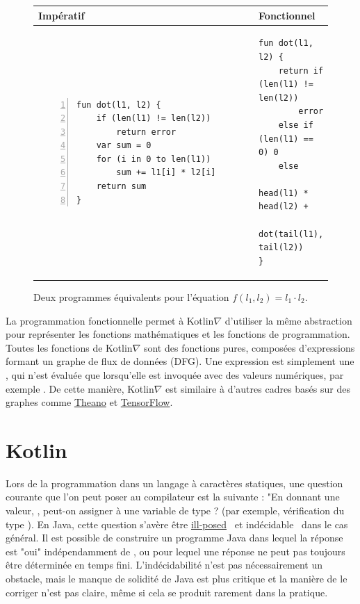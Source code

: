 \begin{figure}[t]
    \centering
    \begin{tabular}{|l|l|}
        \hline
        Impératif & Fonctionnel \\
        \hline
{\begin{lstlisting}[style=barelisting, linewidth=5.7cm, numbers=left]
fun dot(l1, l2) {
    if (len(l1) != len(l2))
        return error
    var sum = 0
    for (i in 0 to len(l1))
        sum += l1[i] * l2[i]
    return sum
}
\end{lstlisting}}
        &
{\begin{lstlisting}[style=barelisting, linewidth=6.5cm, numbers=none]
fun dot(l1, l2) {
    return if (len(l1) != len(l2))
        error
    else if (len(l1) == 0) 0
    else
        head(l1) * head(l2) +
        dot(tail(l1), tail(l2))
}
\end{lstlisting}}
        \\
        \hline
    \end{tabular}
    \caption{Deux programmes équivalents pour l'équation $f(l_1, l_2) = l_1 \cdot l_2$.}
    \label{fig:fp_vs_ip}
\end{figure}

La programmation fonctionnelle permet à Kotlin$\nabla$ d'utiliser la même abstraction pour représenter les fonctions mathématiques et les fonctions de programmation. Toutes les fonctions de Kotlin$\nabla$ sont des fonctions pures, composées d'expressions formant un graphe de flux de données (DFG). Une expression est simplement une , qui n'est évaluée que lorsqu'elle est invoquée avec des valeurs numériques, par exemple . De cette manière, Kotlin$\nabla$ est similaire à d'autres cadres basés sur des graphes comme \href{http://deeplearning.net/software/theano/extending/graphstructures.html}{Theano} et \href{https://www.tensorflow.org/guide/graphs}{TensorFlow}.

\section{Kotlin}\label{sec:kotlin}

Lors de la programmation dans un langage à caractères statiques, une question courante que l'on peut poser au compilateur est la suivante : "En donnant une valeur, , peut-on assigner  à une variable de type ? (par exemple, vérification du type ). En Java, cette question s'avère être \href{http://io.livecode.ch/learn/namin/unsound}{ill-posed}~\citep{amin2016java} et indécidable~\citep{grigore2017java} dans le cas général. Il est possible de construire un programme Java dans lequel la réponse est "oui" indépendamment de , ou pour lequel une réponse ne peut pas toujours être déterminée en temps fini. L'indécidabilité n'est pas nécessairement un obstacle, mais le manque de solidité de Java est plus critique et la manière de le corriger n'est pas claire, même si cela se produit rarement dans la pratique.

